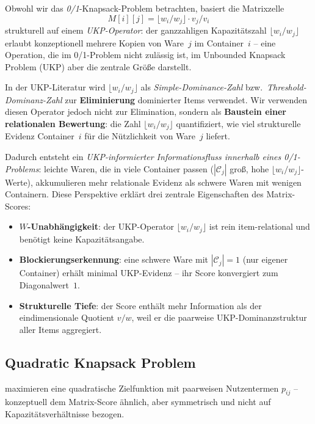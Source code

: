 \documentclass[a4paper,11pt]{article}
\begin{document}
Obwohl wir das \emph{0/1}-Knapsack-Problem betrachten, basiert
die Matrixzelle
\[
M[i][j] = \lfloor w_i/w_j \rfloor \cdot v_j/v_i
\]
strukturell auf einem \emph{UKP-Operator}: der ganzzahligen
Kapazitätszahl $\lfloor w_i/w_j \rfloor$ erlaubt konzeptionell
mehrere Kopien von Ware~$j$ im Container~$i$ -- eine Operation,
die im 0/1-Problem nicht zulässig ist, im Unbounded Knapsack
Problem (UKP) aber die zentrale Größe darstellt.

\medskip
\noindent
In der UKP-Literatur wird $\lfloor w_i/w_j \rfloor$ als
\emph{Simple-Dominance-Zahl} \citep{kellerer2004} bzw.\
\emph{Threshold-Dominanz-Zahl} \citep{andonov2000} zur
\textbf{Eliminierung} dominierter Items verwendet.
Wir verwenden diesen Operator jedoch nicht zur Elimination,
sondern als \textbf{Baustein einer relationalen Bewertung}:
die Zahl $\lfloor w_i/w_j \rfloor$ quantifiziert, wie viel
strukturelle Evidenz Container~$i$ für die Nützlichkeit von
Ware~$j$ liefert.

\medskip
\noindent
Dadurch entsteht ein \emph{UKP-informierter Informationsfluss
innerhalb eines 0/1-Problems}: leichte Waren, die in viele
Container passen ($|\mathcal{C}_j|$ groß, hohe
$\lfloor w_i/w_j \rfloor$-Werte), akkumulieren mehr relationale
Evidenz als schwere Waren mit wenigen Containern.
Diese Perspektive erklärt drei zentrale Eigenschaften des
Matrix-Scores:
\begin{itemize}[topsep=2pt]
  \item \textbf{$W$-Unabhängigkeit}: der UKP-Operator
    $\lfloor w_i/w_j \rfloor$ ist rein item-relational und
    benötigt keine Kapazitätsangabe.
  \item \textbf{Blockierungserkennung}: eine schwere Ware mit
    $|\mathcal{C}_j| = 1$ (nur eigener Container) erhält
    minimal UKP-Evidenz -- ihr Score konvergiert zum
    Diagonalwert~$1$.
  \item \textbf{Strukturelle Tiefe}: der Score enthält mehr
    Information als der eindimensionale Quotient $v/w$, weil
    er die paarweise UKP-Dominanzstruktur aller Items aggregiert.
\end{itemize}

\subsection{Quadratic Knapsack Problem}

\citet{gallo1980} maximieren eine quadratische Zielfunktion mit
paarweisen Nutzentermen $p_{ij}$ -- konzeptuell dem Matrix-Score ähnlich,
aber symmetrisch und nicht auf Kapazitätsverhältnisse bezogen.
\end{document}
